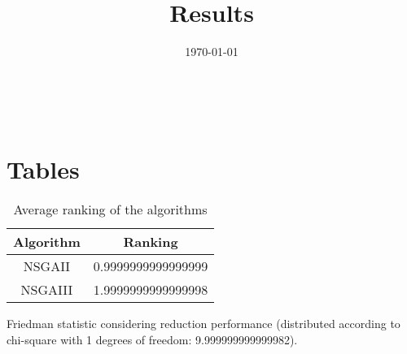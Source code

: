 \documentclass{article}
\title{Results}
\author{}
\date{\today}
\begin{document}
\oddsidemargin 0in \topmargin 0in\maketitle
\
\section{Tables}
\begin{table}[!htp]
\centering
\caption{Average ranking of the algorithms}
\begin{tabular}{c|c}
Algorithm&Ranking\\
\hline
NSGAII&0.9999999999999999\\
NSGAIII&1.9999999999999998\\
\end{tabular}
\end{table}


Friedman statistic considering reduction performance (distributed according to chi-square with 1 degrees of freedom: 9.999999999999982).
\end{document}
